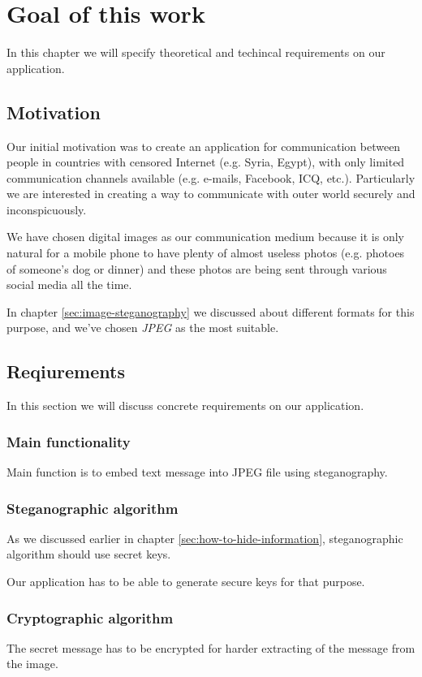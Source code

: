 \chapter{Goal of this work}

In this chapter we will specify theoretical and techincal 
requirements on our application.

\section{Motivation}

Our initial motivation was to create an application for communication between
people in countries with censored Internet (e.g. Syria, Egypt), with only limited communication channels
available (e.g. e-mails, Facebook, ICQ, etc.). Particularly we are interested in
creating a way to communicate with outer world securely and inconspicuously.

We have chosen digital images as our communication medium because it is only natural for
a mobile phone to have plenty of almost useless photos (e.g. photoes of someone's dog or dinner)
and these photos are being sent through various social media all the time.

In chapter \ref{sec:image-steganography} we discussed about different formats for
this purpose, and we've chosen \emph{JPEG} as the most suitable.

\section{Reqiurements}

In this section we will discuss concrete requirements on our application.

\subsection{Main functionality}
Main function is to embed text message into JPEG file using steganography.

\subsection{Steganographic algorithm}
As we discussed earlier in chapter \ref{sec:how-to-hide-information}, 
steganographic algorithm should use secret keys.

Our application has to be able to generate secure keys for that purpose.

\subsection{Cryptographic algorithm}
The secret message has to be encrypted for harder extracting of 
the message from the image.

